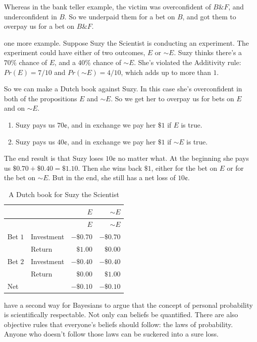 \documentclass[justified]{tufte-book}
\providecommand{\tightlist}{%
  \setlength{\itemsep}{0pt}\setlength{\parskip}{0pt}}
\renewcommand{\neg}{\mathbin{\sim}}
\renewcommand{\wedge}{\mathbin{\&}}
\newcommand{\p}{Pr}
\theoremstyle{definition}
\theoremstyle{definition}
\theoremstyle{definition}
\theoremstyle{definition}
\theoremstyle{remark}
\begin{document}
Whereas in the bank teller example, the victim was overconfident of \(B \wedge F\), and underconfident in \(B\). So we underpaid them for a bet on \(B\), and got them to overpay us for a bet on \(B \wedge F\).

 one more example. Suppose Suzy the Scientist is conducting an experiment. The experiment could have either of two outcomes, \(E\) or \(\neg E\). Suzy thinks there's a \(70\%\) chance of \(E\), and a \(40\%\) chance of \(\neg E\). She's violated the Additivity rule: \(\p(E) = 7/10\) and \(\p(\neg E) = 4/10\), which adds up to more than \(1\).

So we can make a Dutch book against Suzy. In this case she's overconfident in both of the propositions \(E\) and \(\neg E\). So we get her to overpay us for bets on \(E\) and on \(\neg E\).

\begin{enumerate}
\def\labelenumi{\arabic{enumi}.}
\tightlist
\item
  Suzy pays us \(70\)¢, and in exchange we pay her \(\$1\) if \(E\) is true.
\item
  Suzy pays us \(40\)¢, and in exchange we pay her \(\$1\) if \(\neg E\) is true.
\end{enumerate}

The end result is that Suzy loses \(10\)¢ no matter what. At the beginning she pays us \(\$0.70 + \$0.40 = \$1.10\). Then she wins back \(\$1\), either for the bet on \(E\) or for the bet on \(\neg E\). But in the end, she still has a net loss of \(10\)¢.

\begin{longtable}[]{@{}llrr@{}}
\caption{\label{tab:unnamed-chunk-130}A Dutch book for Suzy the Scientist}\tabularnewline
\toprule
& & \(E\) & \(\neg E\) \\
\midrule
\endfirsthead
\toprule
& & \(E\) & \(\neg E\) \\
\midrule
\endhead
Bet \(1\) & Investment & \(-\$0.70\) & \(-\$0.70\) \\
& Return & \(\$1.00\) & \(\$0.00\) \\
Bet \(2\) & Investment & \(-\$0.40\) & \(-\$0.40\) \\
& Return & \(\$0.00\) & \(\$1.00\) \\
Net & & \(-\$0.10\) & \(-\$0.10\) \\
\bottomrule
\end{longtable}

 have a second way for Bayesians to argue that the concept of personal probability is scientifically respectable. Not only can beliefs be quantified. There are also objective rules that everyone's beliefs should follow: the laws of probability. Anyone who doesn't follow those laws can be suckered into a sure loss.
\end{document}

